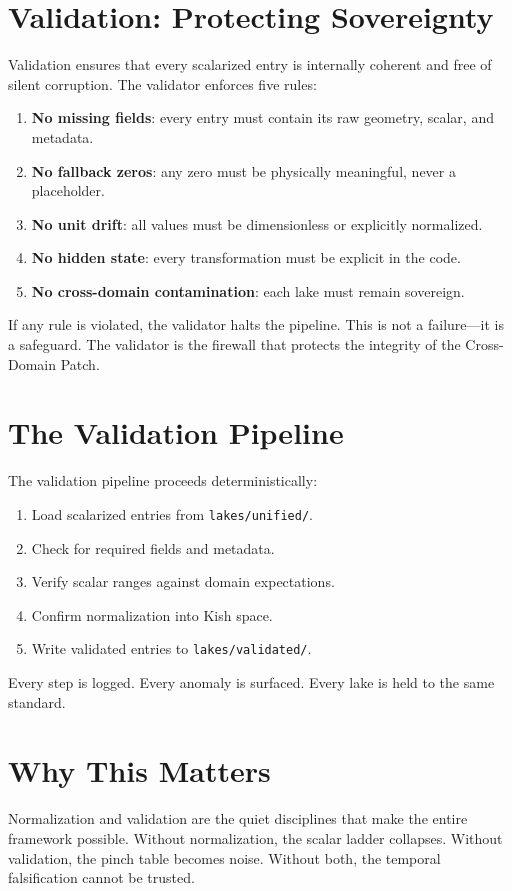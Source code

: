 \documentclass[11pt, letterpaper, openany]{book}
\begin{document}
\section*{Validation: Protecting Sovereignty}
Validation ensures that every scalarized entry is internally coherent and free of silent corruption.
The validator enforces five rules:

\begin{enumerate}
    \item \textbf{No missing fields}: every entry must contain its raw geometry, scalar, and metadata.
    \item \textbf{No fallback zeros}: any zero must be physically meaningful, never a placeholder.
    \item \textbf{No unit drift}: all values must be dimensionless or explicitly normalized.
    \item \textbf{No hidden state}: every transformation must be explicit in the code.
    \item \textbf{No cross-domain contamination}: each lake must remain sovereign.
\end{enumerate}

If any rule is violated, the validator halts the pipeline.  
This is not a failure—it is a safeguard.  
The validator is the firewall that protects the integrity of the Cross-Domain Patch.

\section*{The Validation Pipeline}
The validation pipeline proceeds deterministically:

\begin{enumerate}
    \item Load scalarized entries from \texttt{lakes/unified/}.
    \item Check for required fields and metadata.
    \item Verify scalar ranges against domain expectations.
    \item Confirm normalization into Kish space.
    \item Write validated entries to \texttt{lakes/validated/}.
\end{enumerate}

Every step is logged.  
Every anomaly is surfaced.  
Every lake is held to the same standard.

\section*{Why This Matters}
Normalization and validation are the quiet disciplines that make the entire framework possible.
Without normalization, the scalar ladder collapses.  
Without validation, the pinch table becomes noise.  
Without both, the temporal falsification cannot be trusted.
\end{document}
